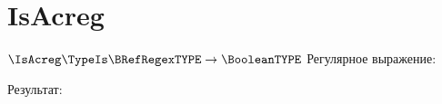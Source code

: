 \section{IsAcreg}
\begin{frame}{$\IsAcreg\TypeIs\BRefRegexTYPE\to\BooleanTYPE$}
	Регулярное выражение:

	Результат:

\end{frame}